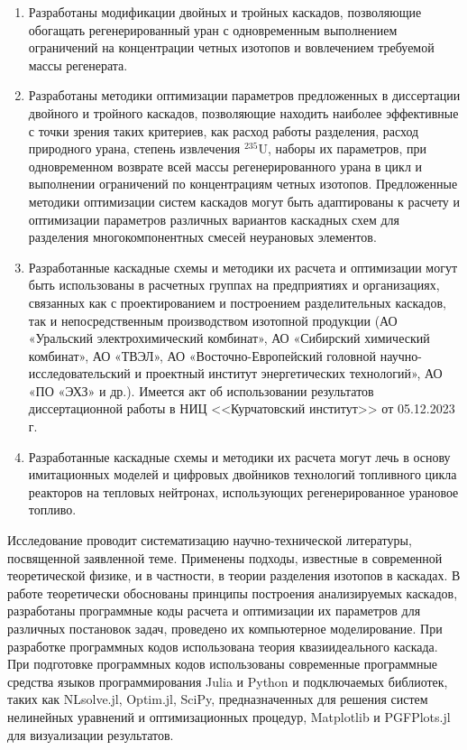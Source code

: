 \newpage
{\influence} 
\begin{enumerate}[leftmargin=0.5cm]
  \item Разработаны модификации двойных и тройных каскадов, позволяющие обогащать регенерированный уран с одновременным выполнением ограничений на концентрации четных изотопов и вовлечением требуемой массы регенерата.
  \item Разработаны методики оптимизации параметров предложенных в диссертации двойного и тройного каскадов, позволяющие находить наиболее эффективные с точки зрения таких критериев, как расход работы разделения, расход природного урана, степень извлечения $^{235}$U, наборы их параметров, при одновременном возврате всей массы регенерированного урана в цикл и выполнении ограничений по концентрациям четных изотопов. Предложенные методики оптимизации систем каскадов могут быть адаптированы к расчету и оптимизации параметров различных вариантов каскадных схем для разделения многокомпонентных смесей неурановых элементов.
  \item Разработанные каскадные схемы и методики их расчета и оптимизации могут быть использованы в расчетных группах на предприятиях и организациях, связанных как с проектированием и построением разделительных каскадов, так и непосредственным производством изотопной продукции (АО «Уральский электрохимический комбинат», АО «Сибирский химический комбинат», АО «ТВЭЛ», АО «Восточно-Европейский головной научно-исследовательский и проектный институт энергетических технологий», АО «ПО «ЭХЗ» и др.). Имеется акт об использовании результатов диссертационной работы в НИЦ <<Курчатовский институт>> от 05.12.2023 г.
  \item Разработанные каскадные схемы и методики их расчета могут лечь в основу имитационных моделей и цифровых двойников технологий топливного цикла реакторов на тепловых нейтронах, использующих регенерированное урановое топливо.  
\end{enumerate}

{\methods}
Исследование проводит систематизацию научно-технической литературы, посвященной заявленной теме.
Применены подходы, известные в современной теоретической физике, и в частности, в теории разделения изотопов в каскадах.
В работе теоретически обоснованы принципы построения анализируемых каскадов, разработаны программные коды расчета и оптимизации их параметров для различных постановок задач, проведено их компьютерное моделирование.
При разработке программных кодов использована теория квазиидеального каскада. При подготовке программных кодов использованы современные программные средства языков программирования Julia и Python и подключаемых библиотек, таких как NLsolve.jl, Optim.jl, SciPy, предназначенных для решения систем нелинейных уравнений и оптимизационных процедур, Matplotlib и PGFPlots.jl для визуализации результатов.

